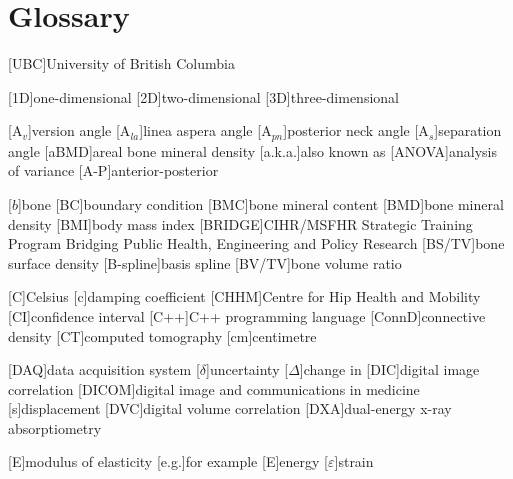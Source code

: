 
\chapter{Glossary}

[UBC]{University of British Columbia}

\begin{acronym}[HR-pQCT] %
[1D]{one-dimensional}
[2D]{two-dimensional}
[3D]{three-dimensional}

[A$_v$]{version angle}
[A$_{la}$]{linea aspera angle}
[A$_{pn}$]{posterior neck angle}
[A$_s$]{separation angle}
[aBMD]{areal bone mineral density}
[a.k.a.]{also known as}
[ANOVA]{analysis of variance}
[A-P]{anterior-posterior}

[$b$]{bone}
[BC]{boundary condition}
[BMC]{bone mineral content}
[BMD]{bone mineral density}
[BMI]{body mass index}
[BRIDGE]{CIHR/MSFHR Strategic Training Program Bridging Public Health, Engineering and Policy Research}
[BS/TV]{bone surface density}
[B-spline]{basis spline}
[BV/TV]{bone volume ratio}

[C]{Celsius}
[c]{damping coefficient}
[CHHM]{Centre for Hip Health and Mobility}
[CI]{confidence interval}
[C++]{C++ programming language}
[ConnD]{connective density}
[CT]{computed tomography}
[cm]{centimetre}

[DAQ]{data acquisition system}
[$\delta$]{uncertainty}
[$\Delta$]{change in}
[DIC]{digital image correlation}
[DICOM]{digital image and communications in medicine}
[s]{displacement}
[DVC]{digital volume correlation}
[DXA]{dual-energy x-ray absorptiometry}

[E]{modulus of elasticity}
[e.g.]{for example}
[E]{energy}
[$\varepsilon$]{strain}


\end{acronym}
